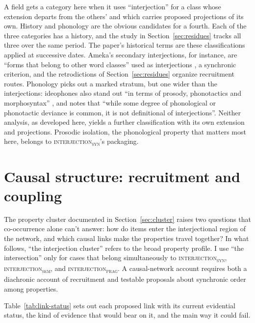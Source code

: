 \documentclass[12pt]{article}
\newcommand{\intj}[1]{\textsc{interjection\textsubscript{#1}}}
\begin{document}
A field gets a category here when it uses \enquote{interjection} for a class
whose extension departs from the others' and which carries proposed
projections of its own. History and phonology are the obvious candidates for
a fourth. Each of the three categories has a history, and the 
study in Section~\ref{sec:residues} tracks all three over the same period.
The paper's historical terms are these classifications applied at successive
dates. Ameka's secondary interjections, for instance, are \enquote{forms that
belong to other word classes} used as interjections \citep[105]{ameka1992},
a synchronic criterion, and the retrodictions of Section~\ref{sec:residues}
organize recruitment routes. Phonology picks out a marked stratum, but one
wider than the interjections: ideophones also stand out \enquote{in terms of
prosody, phonotactics and morphosyntax} \citep[3]{dingemanse2018}, and
\textcite[3]{dingemanse2023preprint} notes that \enquote{while some degree
of phonological or phonotactic deviance is common, it is not definitional of
interjections}. Neither analysis, as developed here, yields a further
classification with its own extension and projections. Prosodic isolation,
the phonological property that matters most here, belongs to \intj{syn}'s
packaging.

\section[Causal structure]{Causal structure: recruitment and coupling}\label{sec:causal-structure}

The property cluster documented in Section~\ref{sec:cluster} raises two
questions that co-occurrence alone can't answer: how do items enter the
interjectional region of the network, and which causal links make the
properties travel together? In what follows, \enquote{the
interjection cluster} refers to the broad property profile. I use
\enquote{the intersection} only for cases that belong simultaneously to
\intj{syn}, \intj{sem}, and
\intj{prag}.
A causal-network account requires both a diachronic account of
recruitment and testable proposals about synchronic order among properties.

Table~\ref{tab:link-status} sets out each proposed link with its current
evidential status, the kind of evidence that would bear on it, and the
main way it could fail.
\end{document}
